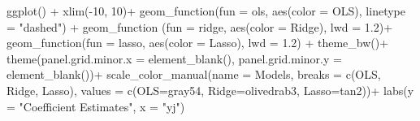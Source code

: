 \documentclass[
]{article}
\newenvironment{Shaded}{\begin{snugshade}}{\end{snugshade}}
\newcommand{\AttributeTok}[1]{\textcolor[rgb]{0.77,0.63,0.00}{#1}}
\newcommand{\DecValTok}[1]{\textcolor[rgb]{0.00,0.00,0.81}{#1}}
\newcommand{\FloatTok}[1]{\textcolor[rgb]{0.00,0.00,0.81}{#1}}
\newcommand{\FunctionTok}[1]{\textcolor[rgb]{0.00,0.00,0.00}{#1}}
\newcommand{\NormalTok}[1]{#1}
\newcommand{\OtherTok}[1]{\textcolor[rgb]{0.56,0.35,0.01}{#1}}
\newcommand{\SpecialCharTok}[1]{\textcolor[rgb]{0.00,0.00,0.00}{#1}}
\newcommand{\StringTok}[1]{\textcolor[rgb]{0.31,0.60,0.02}{#1}}
\begin{document}
\begin{Shaded}
\begin{Highlighting}[]
\FunctionTok{ggplot}\NormalTok{() }\SpecialCharTok{+}
  \FunctionTok{xlim}\NormalTok{(}\SpecialCharTok{{-}}\DecValTok{10}\NormalTok{, }\DecValTok{10}\NormalTok{)}\SpecialCharTok{+}
  \FunctionTok{geom\_function}\NormalTok{(}\AttributeTok{fun =}\NormalTok{ ols,}
                \FunctionTok{aes}\NormalTok{(}\AttributeTok{color =} \StringTok{\textquotesingle{}OLS\textquotesingle{}}\NormalTok{),}
                \AttributeTok{linetype =} \StringTok{"dashed"}\NormalTok{) }\SpecialCharTok{+}
  \FunctionTok{geom\_function}\NormalTok{ (}\AttributeTok{fun =}\NormalTok{ ridge,}
                 \FunctionTok{aes}\NormalTok{(}\AttributeTok{color =} \StringTok{\textquotesingle{}Ridge\textquotesingle{}}\NormalTok{),}
                 \AttributeTok{lwd =} \FloatTok{1.2}\NormalTok{)}\SpecialCharTok{+}
  \FunctionTok{geom\_function}\NormalTok{(}\AttributeTok{fun =}\NormalTok{ lasso,}
                \FunctionTok{aes}\NormalTok{(}\AttributeTok{color =} \StringTok{\textquotesingle{}Lasso\textquotesingle{}}\NormalTok{),}
                \AttributeTok{lwd =} \FloatTok{1.2}\NormalTok{) }\SpecialCharTok{+}
  \FunctionTok{theme\_bw}\NormalTok{()}\SpecialCharTok{+}
  \FunctionTok{theme}\NormalTok{(}\AttributeTok{panel.grid.minor.x =} \FunctionTok{element\_blank}\NormalTok{(),}
        \AttributeTok{panel.grid.minor.y =} \FunctionTok{element\_blank}\NormalTok{())}\SpecialCharTok{+}
  \FunctionTok{scale\_color\_manual}\NormalTok{(}\AttributeTok{name =} \StringTok{\textquotesingle{}Models\textquotesingle{}}\NormalTok{,}
                     \AttributeTok{breaks =} \FunctionTok{c}\NormalTok{(}\StringTok{\textquotesingle{}OLS\textquotesingle{}}\NormalTok{, }\StringTok{\textquotesingle{}Ridge\textquotesingle{}}\NormalTok{, }\StringTok{\textquotesingle{}Lasso\textquotesingle{}}\NormalTok{),}
                     \AttributeTok{values =} \FunctionTok{c}\NormalTok{(}\StringTok{\textquotesingle{}OLS\textquotesingle{}}\OtherTok{=}\StringTok{\textquotesingle{}gray54\textquotesingle{}}\NormalTok{, }\StringTok{\textquotesingle{}Ridge\textquotesingle{}}\OtherTok{=}\StringTok{\textquotesingle{}olivedrab3\textquotesingle{}}\NormalTok{, }\StringTok{\textquotesingle{}Lasso\textquotesingle{}}\OtherTok{=}\StringTok{\textquotesingle{}tan2\textquotesingle{}}\NormalTok{))}\SpecialCharTok{+}
  \FunctionTok{labs}\NormalTok{(}\AttributeTok{y =} \StringTok{"Coefficient Estimates"}\NormalTok{, }\AttributeTok{x =} \StringTok{"yj"}\NormalTok{)}
\end{Highlighting}
\end{Shaded}
\end{document}
